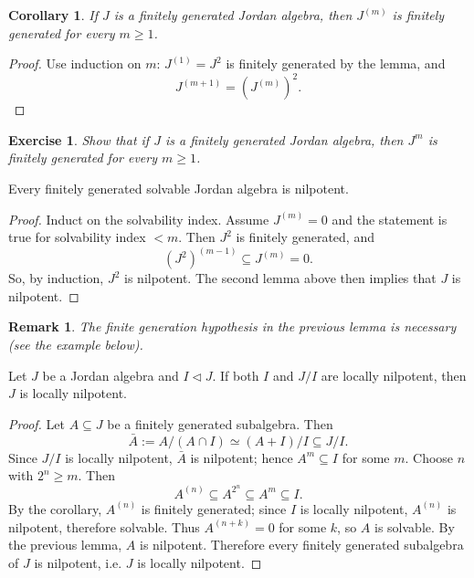 \documentclass{article}
\newtheorem{corollary}[theorem]{Corollary}
\newtheorem{remark}[theorem]{Remark}
\newtheorem{exercise}[theorem]{Exercise}
\begin{document}
\begin{corollary}
If $J$ is a finitely generated Jordan algebra, then $J^{(m)}$ is finitely generated for every $m\ge 1$.
\end{corollary}

\begin{proof}
Use induction on $m$: $J^{(1)}=J^2$ is finitely generated by the lemma, and
\[
J^{(m+1)}=(J^{(m)})^2.
\]
\end{proof}

\begin{exercise}
Show that if $J$ is a finitely generated Jordan algebra, then $J^m$ is finitely generated for every $m\ge 1$.
\end{exercise}

\begin{lemma}
Every finitely generated solvable Jordan algebra is nilpotent.
\end{lemma}

\begin{proof}
Induct on the solvability index. Assume $J^{(m)}=0$ and the statement is true for solvability index $<m$. Then $J^2$ is finitely generated, and
\[
(J^2)^{(m-1)}\subseteq J^{(m)}=0.
\]
So, by induction, $J^2$ is nilpotent. The second lemma above then implies that $J$ is nilpotent.
\end{proof}

\begin{remark}
The finite generation hypothesis in the previous lemma is necessary (see the example below).
\end{remark}

\begin{lemma}
Let $J$ be a Jordan algebra and $I\triangleleft J$. If both $I$ and $J/I$ are locally nilpotent, then $J$ is locally nilpotent.
\end{lemma}

\begin{proof}
Let $A\subseteq J$ be a finitely generated subalgebra. Then
\[
\bar{A}:=A/(A\cap I)\simeq (A+I)/I\subseteq J/I.
\]
Since $J/I$ is locally nilpotent, $\bar{A}$ is nilpotent; hence $A^m\subseteq I$ for some $m$. Choose $n$ with $2^n\ge m$. Then
\[
A^{(n)}\subseteq A^{2^n}\subseteq A^m\subseteq I.
\]
By the corollary, $A^{(n)}$ is finitely generated; since $I$ is locally nilpotent, $A^{(n)}$ is nilpotent, therefore solvable. Thus $A^{(n+k)}=0$ for some $k$, so $A$ is solvable. By the previous lemma, $A$ is nilpotent. Therefore every finitely generated subalgebra of $J$ is nilpotent, i.e. $J$ is locally nilpotent.
\end{proof}
\end{document}
